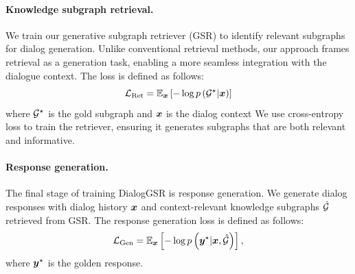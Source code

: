 \paragraph{Knowledge subgraph retrieval.}
We train our generative subgraph retriever (GSR) to identify relevant subgraphs for dialog generation.
Unlike conventional retrieval methods, our approach frames retrieval as a generation task, enabling a more seamless integration with the dialogue context. The loss is defined as follows:
\begin{equation}
    \mathcal{L}_{\text{Ret}} = \mathbb{E}_{\boldsymbol{x}} \left [ -\log p\left({\mathcal{G}}^\star | \boldsymbol{x} \right) \right ] 
\end{equation}
where $\mathcal{G}^{\star}$ is the gold subgraph and $\boldsymbol{x}$ is the dialog context
We use cross-entropy loss to train the retriever, ensuring it generates subgraphs that are both relevant and informative.
\paragraph{Response generation.}
The final stage of training DialogGSR is response generation.
We generate dialog responses with dialog history $\boldsymbol{x}$ and context-relevant knowledge subgraphs $\hat{\mathcal{G}}$ retrieved from GSR. 
The response generation loss is defined as follows:
\begin{equation}
\mathcal{L}_{\text{Gen}} = \mathbb{E}_{\boldsymbol{x}} \left [ -\log p\left(\boldsymbol{y}^\star | \boldsymbol{x}, \hat{\mathcal{G}} \right) \right ],
\end{equation}
where $\boldsymbol{y}^\star$ is the golden response.
